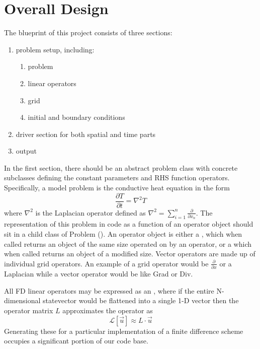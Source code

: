 \documentclass{article}
\begin{document}
	\section{Overall Design}
	The blueprint of this project consists of three sections:
	\begin{enumerate}
		\item problem setup, including:
		\begin{enumerate}
			\item problem
			\item linear operators
			\item grid
			\item initial and boundary conditions
		\end{enumerate} 
		\item driver section for both spatial and time parts
		\item output
	\end{enumerate}
	In the first section, there should be an abstract problem class with concrete subclasses defining the constant parameters and RHS function operators. Specifically, a model problem is the conductive heat equation in the form 
	\begin{equation}
	\frac{\partial T}{\partial t} = \nabla^2 T
	\end{equation}
	where $\nabla^2$ is the Laplacian operator defined as $\nabla^2 = \sum_{i=1}^{n}\frac{\partial}{\partial x_n}$. 
	The representation of this problem in code as a function of an operator object  should sit in a child class of Problem (). An operator object is either a , which when called returns an object of the same size operated on by an operator, or a  which when called returns an object of a modified size. Vector operators are made up of individual grid operators. An example of a grid operator would be $\frac{\partial}{\partial x}$ or a Laplacian while a vector operator would be like Grad or Div. 

	All FD linear operators may be expressed as an , where if the entire N-dimensional statevector would be flattened into a single 1-D vector then the operator matrix $L$ approximates the operator as
	\begin{equation}
		\mathcal{L}[\vec{u}] \approx L \cdot \vec{u}
	\end{equation}
	Generating these  for a particular implementation of a finite difference scheme occupies a significant portion of our code base.
\end{document}
